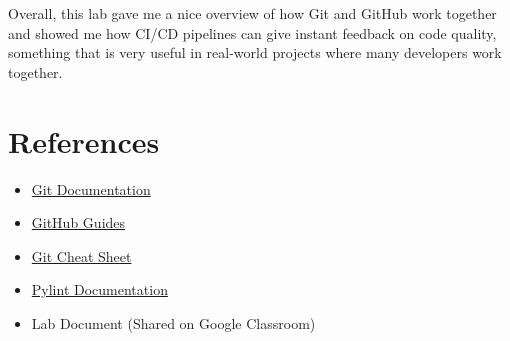\documentclass[10pt,a4paper]{report}
\begin{document}
Overall, this lab gave me a nice overview of how Git and GitHub work together and showed me how CI/CD pipelines can give instant feedback on code quality, something that is very useful in real-world projects where many developers work together.




\section{References}
\begin{itemize}[itemsep=0.01em, topsep=0pt]
    \item \href{https://git-scm.com/doc}{Git Documentation}
    \item \href{https://docs.github.com/en}{GitHub Guides}
    \item \href{https://education.github.com/git-cheat-sheet-education.pdf}{Git Cheat Sheet}
    \item \href{https://docs.pylint.org/}{Pylint Documentation}
    \item Lab Document (Shared on Google Classroom)
\end{itemize}
\end{document}
